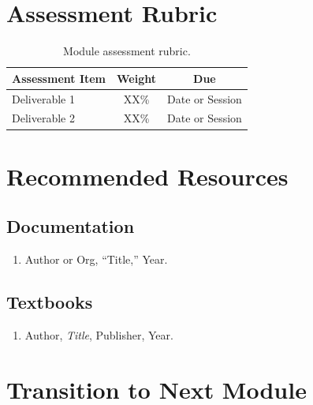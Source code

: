 \documentclass[11pt,letterpaper]{article}
\begin{document}
	\section{Assessment Rubric}
	
	\begin{table}[ht!]
		\centering
		\caption{Module assessment rubric.}
		\label{tab:rubric}
		\renewcommand{\arraystretch}{1.3}
		\begin{tabularx}{\textwidth}{X c c}
			\toprule
			\textbf{Assessment Item} & \textbf{Weight} & \textbf{Due} \\
			\midrule
			Deliverable 1 & XX\% & Date or Session \\
			Deliverable 2 & XX\% & Date or Session \\
			\bottomrule
		\end{tabularx}
	\end{table}
	
	\newpage
	\section{Recommended Resources}
	
	\subsection{Documentation}
	\begin{enumerate}[leftmargin=2em]
		\item Author or Org, ``Title,'' Year.
	\end{enumerate}
	
	\subsection{Textbooks}
	\begin{enumerate}[leftmargin=2em]
		\item Author, \textit{Title}, Publisher, Year.
	\end{enumerate}
	
	\section{Transition to Next Module}
	
\end{document}
